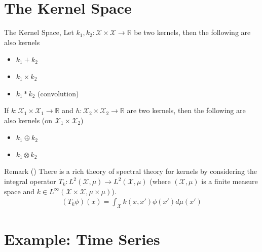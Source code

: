 \documentclass[10pt]{beamer}
\begin{document}
\section{The Kernel Space}

\begin{frame}{The Kernel Space}{\cite{ROERGA}, \cite[Chapter 4]{RW05}}
Let $k_1, k_2: \mathcal{X}\times\mathcal{X}\longrightarrow \mathbb{R}$ be two kernels, then the following are also kernels 
\begin{itemize}
\item $k_1 + k_2$ 
\item $k_1 \times k_2$
\item $k_1*k_2$ (convolution)
\end{itemize}
If $k: \mathcal{X}_1\times\mathcal{X}_1\longrightarrow \mathbb{R}$ and $h: \mathcal{X}_2\times\mathcal{X}_2\longrightarrow \mathbb{R}$ are two kernels, then the following are also kernels (on $\mathcal{X}_1 \times \mathcal{X}_2$)
\begin{itemize}
\item $k_1 \oplus k_2$ 
\item $k_1 \otimes k_2$
\end{itemize}
\begin{block}{Remark (\cite[Chapter 4.3]{RW05})}
There is a rich theory of spectral theory for kernels by considering the integral operator $T_k : L^2(\mathcal{X}, \mu) \longrightarrow L^2(\mathcal{X}, \mu)$ (where $(\mathcal{X}, \mu)$ is a finite measure space and $k\in L^{\infty}(\mathcal{X}\times \mathcal{X} , \mu\times\mu)$). 
\begin{align*}
(T_k\phi)(x) = \int_{\mathcal{X}} k(x, x')\phi(x') d\mu(x')
\end{align*}
\end{block}
\end{frame}

\section{Example: Time Series}
\end{document}
